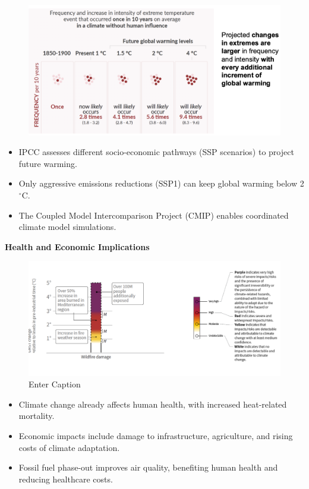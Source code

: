 \documentclass[fontsize=8pt, a4paper, landscape, fleqn]{scrartcl}
\renewcommand{\subsection}[1]{%
    \noindent\colorbox{subsectioncolor}{%
        \parbox{\dimexpr\columnwidth-2\fboxsep}{\color{white}\textbf{#1}}}%
    \vspace{0.5mm}%
}
\begin{document}
\begin{multicols*}{3}[\raggedcolumns]
\begin{figure}[H]
    \centering
    \includegraphics[width=1\linewidth]{CS//img/changes_in_extremes.png}
\end{figure}
\begin{itemize}
    \item IPCC assesses different socio-economic pathways (SSP scenarios) to project future warming.
    \item Only aggressive emissions reductions (SSP1) can keep global warming below 2$^{\circ}$C.
    \item The Coupled Model Intercomparison Project (CMIP) enables coordinated climate model simulations.
\end{itemize}

\subsection{Health and Economic Implications}
\begin{figure}[H]
    \centering
    \includegraphics[width=1\linewidth]{CS//img/IPCC_IMPLICATIONS.png}
    \caption{Enter Caption}
    \label{fig:enter-label}
\end{figure}
\begin{itemize}
    \item Climate change already affects human health, with increased heat-related mortality.
    \item Economic impacts include damage to infrastructure, agriculture, and rising costs of climate adaptation.
    \item Fossil fuel phase-out improves air quality, benefiting human health and reducing healthcare costs.
\end{itemize}

\end{multicols*}
\end{document}
